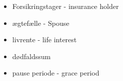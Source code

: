 \begin{itemize}
	\item Forsikringstager - insurance holder
	\item ægtefælle - Spouse
	\item livrente - life interest
	\item dødfaldssum
	\item pause periode - grace period
\end{itemize}